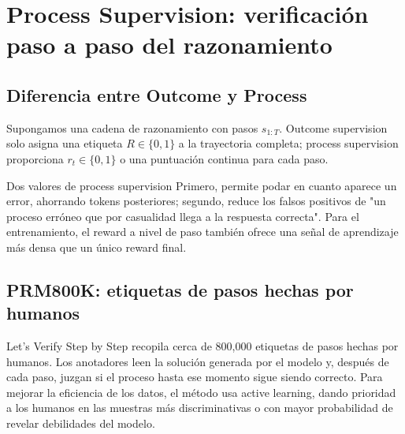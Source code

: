\section{Process Supervision: verificación paso a paso del razonamiento}

\subsection{Diferencia entre Outcome y Process}

Supongamos una cadena de razonamiento con pasos $s_{1:T}$. Outcome supervision solo asigna una etiqueta $R\in\{0,1\}$ a la trayectoria completa; process supervision proporciona $r_t\in\{0,1\}$ o una puntuación continua para cada paso.



\begin{importantbox}{Dos valores de process supervision}
Primero, permite podar en cuanto aparece un error, ahorrando tokens posteriores; segundo, reduce los falsos positivos de "un proceso erróneo que por casualidad llega a la respuesta correcta". Para el entrenamiento, el reward a nivel de paso también ofrece una señal de aprendizaje más densa que un único reward final.
\end{importantbox}

\subsection{PRM800K: etiquetas de pasos hechas por humanos}

Let's Verify Step by Step recopila cerca de 800,000 etiquetas de pasos hechas por humanos. Los anotadores leen la solución generada por el modelo y, después de cada paso, juzgan si el proceso hasta ese momento sigue siendo correcto. Para mejorar la eficiencia de los datos, el método usa active learning, dando prioridad a los humanos en las muestras más discriminativas o con mayor probabilidad de revelar debilidades del modelo.


